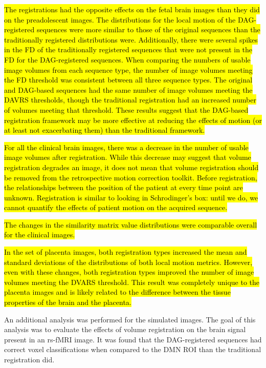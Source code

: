 \hl{The registrations had the opposite effects on the fetal brain images than they did on the preadolescent images. The distributions for the local motion of the DAG-registered sequences were more similar to those of the original sequences than the traditionally registered distributions were. Additionally, there were several spikes in the FD of the traditionally registered sequences that were not present in the FD for the DAG-registered sequences. When comparing the numbers of usable image volumes from each sequence type, the number of image volumes meeting the FD threshold was consistent between all three sequence types. The original and DAG-based sequences had the same number of image volumes meeting the DAVRS thresholds, though the traditional registration had an increased number of volumes meeting that threshold. These results suggest that the DAG-based registration framework may be more effective at reducing the effects of motion (or at least not exacerbating them) than the traditional framework.}

\hl{For all the clinical brain images, there was a decrease in the number of usable image volumes after registration. While this decrease may suggest that volume registration degrades an image, it does not mean that volume registration should be removed from the retrospective motion correction toolkit. Before registration, the relationships between the position of the patient at every time point are unknown. Registration is similar to looking in Schrodinger's box: until we do, we cannot quantify the effects of patient motion on the acquired sequence.}

\hl{The changes in the similarity matrix value distributions were comparable overall for the clinical images.}

\hl{In the set of placenta images, both registration types increased the mean and standard deviations of the distributions of both local motion metrics. However, even with these changes, both registration types improved the number of image volumes meeting the DVARS threshold. This result was completely unique to the placenta images and is likely related to the difference between the tissue properties of the brain and the placenta.}

An additional analysis was performed for the simulated images. The goal of this analysis was to evaluate the effects of volume registration on the brain signal present in an rs-fMRI image. It was found that the DAG-registered sequences had correct voxel classifications when compared to the DMN ROI than the traditional registration did. 

